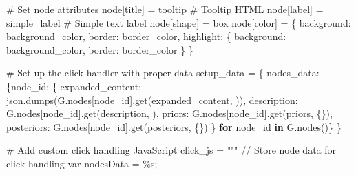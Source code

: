 \documentclass[
  11pt,
  letterpaper,
]{book}
\newenvironment{Shaded}{\begin{snugshade}}{\end{snugshade}}
\newcommand{\CommentTok}[1]{\textcolor[rgb]{0.37,0.37,0.37}{#1}}
\newcommand{\ControlFlowTok}[1]{\textcolor[rgb]{0.00,0.23,0.31}{\textbf{#1}}}
\newcommand{\KeywordTok}[1]{\textcolor[rgb]{0.00,0.23,0.31}{\textbf{#1}}}
\newcommand{\NormalTok}[1]{\textcolor[rgb]{0.00,0.23,0.31}{#1}}
\newcommand{\OperatorTok}[1]{\textcolor[rgb]{0.37,0.37,0.37}{#1}}
\newcommand{\SpecialCharTok}[1]{\textcolor[rgb]{0.37,0.37,0.37}{#1}}
\newcommand{\StringTok}[1]{\textcolor[rgb]{0.13,0.47,0.30}{#1}}
\begin{document}
\begin{landscape}
\begin{Shaded}
\begin{Highlighting}[]
        \CommentTok{\# Set node attributes}
\NormalTok{        node[}\StringTok{\textquotesingle{}title\textquotesingle{}}\NormalTok{] }\OperatorTok{=}\NormalTok{ tooltip  }\CommentTok{\# Tooltip HTML}
\NormalTok{        node[}\StringTok{\textquotesingle{}label\textquotesingle{}}\NormalTok{] }\OperatorTok{=}\NormalTok{ simple\_label  }\CommentTok{\# Simple text label}
\NormalTok{        node[}\StringTok{\textquotesingle{}shape\textquotesingle{}}\NormalTok{] }\OperatorTok{=} \StringTok{\textquotesingle{}box\textquotesingle{}}
\NormalTok{        node[}\StringTok{\textquotesingle{}color\textquotesingle{}}\NormalTok{] }\OperatorTok{=}\NormalTok{ \{}
            \StringTok{\textquotesingle{}background\textquotesingle{}}\NormalTok{: background\_color,}
            \StringTok{\textquotesingle{}border\textquotesingle{}}\NormalTok{: border\_color,}
            \StringTok{\textquotesingle{}highlight\textquotesingle{}}\NormalTok{: \{}
                \StringTok{\textquotesingle{}background\textquotesingle{}}\NormalTok{: background\_color,}
                \StringTok{\textquotesingle{}border\textquotesingle{}}\NormalTok{: border\_color}
\NormalTok{            \}}
\NormalTok{        \}}

    \CommentTok{\# Set up the click handler with proper data}
\NormalTok{    setup\_data }\OperatorTok{=}\NormalTok{ \{}
        \StringTok{\textquotesingle{}nodes\_data\textquotesingle{}}\NormalTok{: \{node\_id: \{}
            \StringTok{\textquotesingle{}expanded\_content\textquotesingle{}}\NormalTok{: json.dumps(G.nodes[node\_id].get(}\StringTok{\textquotesingle{}expanded\_content\textquotesingle{}}\NormalTok{, }\StringTok{\textquotesingle{}\textquotesingle{}}\NormalTok{)),}
            \StringTok{\textquotesingle{}description\textquotesingle{}}\NormalTok{: G.nodes[node\_id].get(}\StringTok{\textquotesingle{}description\textquotesingle{}}\NormalTok{, }\StringTok{\textquotesingle{}\textquotesingle{}}\NormalTok{),}
            \StringTok{\textquotesingle{}priors\textquotesingle{}}\NormalTok{: G.nodes[node\_id].get(}\StringTok{\textquotesingle{}priors\textquotesingle{}}\NormalTok{, \{\}),}
            \StringTok{\textquotesingle{}posteriors\textquotesingle{}}\NormalTok{: G.nodes[node\_id].get(}\StringTok{\textquotesingle{}posteriors\textquotesingle{}}\NormalTok{, \{\})}
\NormalTok{        \} }\ControlFlowTok{for}\NormalTok{ node\_id }\KeywordTok{in}\NormalTok{ G.nodes()\}}
\NormalTok{    \}}

    \CommentTok{\# Add custom click handling JavaScript}
\NormalTok{    click\_js }\OperatorTok{=} \StringTok{"""}
\StringTok{    // Store node data for click handling}
\StringTok{    var nodesData = }\SpecialCharTok{\%s}\StringTok{;}


\end{Highlighting}
\end{Shaded}
\end{landscape}
\end{document}
